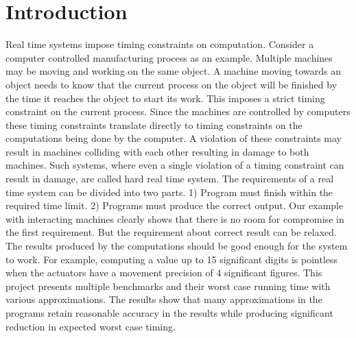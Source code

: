 \section{Introduction}
Real time systems impose timing constraints on computation. Consider a
computer controlled manufacturing process as an example. Multiple
machines may be moving and working on the same object. A machine
moving towards an object needs to know that the current process on the
object will be finished by the time it reaches the object to start its
work. This imposes a strict timing constraint on the current
process. Since the machines are controlled by computers these timing
constraints translate directly to timing constraints on the
computations being done by the computer. A violation of these
constraints may result in machines colliding with each other resulting
in damage to both machines. Such systems, where even a single
violation of a timing constraint can result in damage, are called hard
real time system. The requirements of a real time system can be
divided into two parts. 1) Program must finish within the required
time limit. 2) Programs must produce the correct output. Our example
with interacting machines clearly shows that there is no room for
compromise in the first requirement. But the requirement about correct
result can be relaxed. The results produced by the computations should
be good enough for the system to work. For example, computing a value
up to 15 significant digits is pointless when the actuators have a
movement precision of 4 significant figures. This project presents
multiple benchmarks and their worst case running time with various
approximations. The results show that many approximations in the programs retain reasonable accuracy in the results while producing significant reduction in expected worst case timing. 
